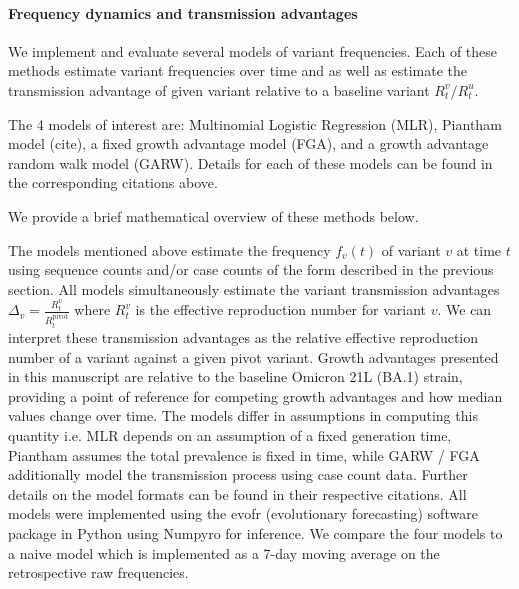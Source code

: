 \documentclass[11pt,oneside,letterpaper]{article}
\begin{document}
\paragraph{Frequency dynamics and transmission advantages}%

We implement and evaluate several models of variant frequencies.
Each of these methods estimate variant frequencies over time and as well as estimate the transmission advantage of given variant relative to a baseline variant $R_{t}^{v} / R_{t}^{u}$.

The 4 models of interest are: Multinomial Logistic Regression (MLR), Piantham model (cite), a fixed growth advantage model (FGA), and a growth advantage random walk model (GARW). 
Details for each of these models can be found in the corresponding citations above.

We provide a brief mathematical overview of these methods below.

The models mentioned above estimate the frequency  $f_{v}(t)$ of variant $v$ at time $t$ using sequence counts and/or case counts of the form described in the previous section.
All models simultaneously estimate the variant transmission advantages $\Delta_{v} = \frac{R_{t}^{v}}{R_{t}^{\text{pivot}}}$ where $R_{t}^{v}$ is the effective reproduction number for variant $v$.
We can interpret these transmission advantages as the relative effective reproduction number of a variant against a given pivot variant.
Growth advantages presented in this manuscript are relative to the baseline Omicron 21L (BA.1) strain, providing a point of reference for competing growth advantages and how median values change over time. 
The models differ in assumptions in computing this quantity i.e. MLR depends on an assumption of a fixed generation time, Piantham assumes the total prevalence is fixed in time, while GARW / FGA additionally model the transmission process using case count data.
Further details on the model formats can be found in their respective citations.
All models were implemented using the evofr (evolutionary forecasting) software package in Python using Numpyro for inference.
We compare the four models to a naive model which is implemented as a 7-day moving average on the retrospective raw frequencies.

%
\end{document}
